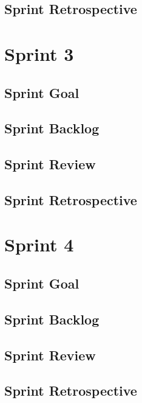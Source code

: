 \documentclass{report}
\begin{document}
    \section{Sprint Retrospective}
        
    
    \chapter{Sprint 3}
    \section{Sprint Goal}
        
    \section{Sprint Backlog}
        
    \section{Sprint Review}
        
    \section{Sprint Retrospective}
        
        
    \chapter{Sprint 4}
    \section{Sprint Goal}
        
    \section{Sprint Backlog}
        
    \section{Sprint Review}
        
    \section{Sprint Retrospective}
        
    
    
    
    

\nocite{*} %
\end{document}
